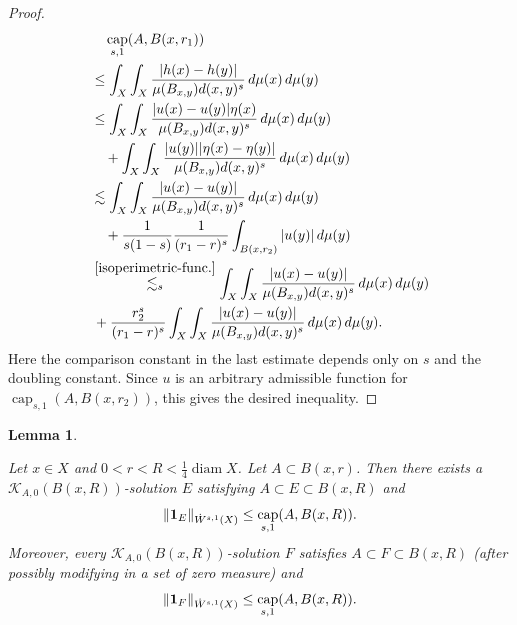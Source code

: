 \documentclass[11pt,leqno]{amsart}
\newtheorem{lemma}[theorem]{Lemma}
\numberwithin{equation}{section}
\theoremstyle{definition}
\DeclareMathOperator{\capp}{cap}
\newcommand{\caps}{\capp_{s,1}}
\DeclareMathOperator{\diam}{diam}
\begin{document}
\begin{proof}
\begin{align}
			&\quad \caps(A, B(x, r_1))\notag \\
			&\leq   \int_X\int_X \frac{|h(x)-h(y)|}{\mu(B_{x,y})d(x,y)^s}\,d\mu(x)\,d\mu(y)\notag \\
			&\leq   \int_X\int_X \frac{|u(x)-u(y)|\eta(x)}{\mu(B_{x,y})d(x,y)^s}\,d\mu(x)\,d\mu(y)\notag \\
			&\quad + \int_X\int_X\frac{|u(y)||\eta(x)-\eta(y)|}{\mu(B_{x,y})d(x,y)^s}\,d\mu(x)\,d\mu(y)\notag \\
			&\lesssim  \int_X\int_X \frac{|u(x)-u(y)|}{\mu(B_{x,y})d(x,y)^s}\,d\mu(x)\,d\mu(y)\notag \\ 
			&\quad +\frac{1}{s(1-s)} \frac{1}{(r_1-r)^s }\int_{B(x,r_2)} {|u(y)|} \,d\mu(y) \notag\\
			&\overset{\eqref{isoperimetric-func.}}{\lesssim_s}
			\int_{X} \int_{X}\frac{|u(x)-u(y)|}{\mu(B_{x,y})d(x,y)^s} \,d\mu(x)  \,d\mu(y)\notag\\
			&\, +\frac{r_2^s}{(r_1-r)^s}\int_{X} \int_{X}\frac{|u(x)-u(y)|}{\mu(B_{x,y})d(x,y)^s} \,d\mu(x)  \,d\mu(y). \label{equ4.2-29oct}
		\end{align}
		Here the comparison constant in the last estimate depends only on $s$ and the doubling constant.
		Since $u$ is an arbitrary admissible function for $\caps(A, B(x, r_2))$, this gives the desired inequality.
	\end{proof}
	\begin{lemma}\label{lemma4.6}
		
		
		Let 
		$x\in X$ and $0<r<R<\frac{1}{4}\diam X$.
		Let   $A\subset B(x,r)$.
		Then there exists a $\mathcal{K}_{A,0}(B(x,R))$-solution $E$ satisfying $A\subset E\subset B(x,R)$ and
		\[
		\|{\bf 1}_{E}\|_{\dot W^{s,1}(X)}\leq \caps(A,B(x,R)).
		\]
		Moreover, every $\mathcal{K}_{A,0}(B(x,R))$-solution $F$ satisfies
		$A\subset F\subset B(x,R)$ (after possibly modifying in a set of zero measure) and
		\begin{equation}\label{eq2.7-19nov}
			\|{\bf 1}_{F}\|_{\dot W^{s,1}(X)}\leq \caps(A,B(x,R)).
		\end{equation}
	\end{lemma}
\end{document}
